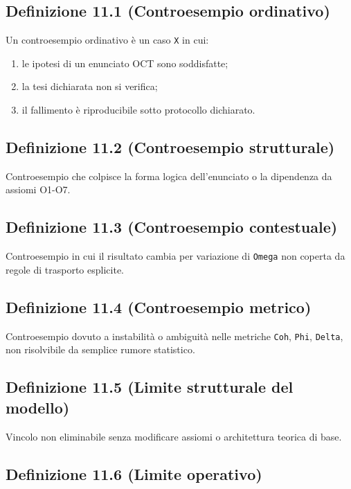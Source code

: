\subsection{Definizione 11.1 (Controesempio ordinativo)}

Un controesempio ordinativo è un caso \texttt{X} in cui:

\begin{enumerate}
\def\labelenumi{\arabic{enumi}.}
\tightlist
\item
  le ipotesi di un enunciato OCT sono soddisfatte;
\item
  la tesi dichiarata non si verifica;
\item
  il fallimento è riproducibile sotto protocollo dichiarato.
\end{enumerate}

\subsection{Definizione 11.2 (Controesempio strutturale)}

Controesempio che colpisce la forma logica dell'enunciato o la dipendenza da assiomi O1-O7.

\subsection{Definizione 11.3 (Controesempio contestuale)}

Controesempio in cui il risultato cambia per variazione di \texttt{Omega} non coperta da regole di trasporto esplicite.

\subsection{Definizione 11.4 (Controesempio metrico)}

Controesempio dovuto a instabilità o ambiguità nelle metriche \texttt{Coh}, \texttt{Phi}, \texttt{Delta}, non risolvibile da semplice rumore statistico.

\subsection{Definizione 11.5 (Limite strutturale del modello)}

Vincolo non eliminabile senza modificare assiomi o architettura teorica di base.

\subsection{Definizione 11.6 (Limite operativo)}

